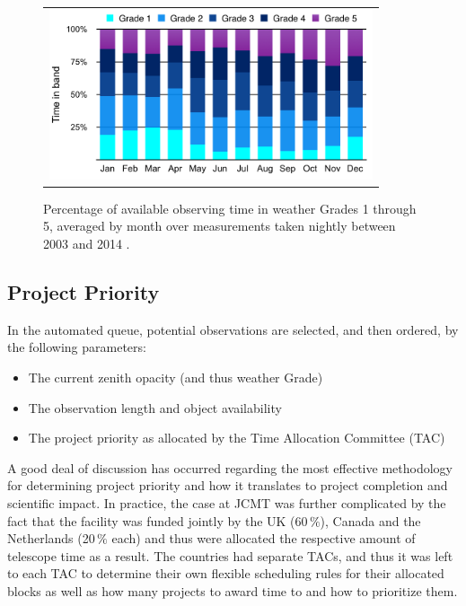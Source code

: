 \documentclass[]{spie}  %
\begin{document}
  \begin{figure}[h]
   \begin{center}
   \begin{tabular}{c}
   \includegraphics[height=5cm]{tauaverageperc}
   \end{tabular}
   \end{center}
   \caption{\label{fig:tau} Percentage of available observing time in weather Grades 1 through 5, averaged by month over measurements taken nightly between 2003 and 2014 .}
\end{figure}

\subsection{Project Priority}

In the automated queue, potential observations are selected, and then
ordered, by the following parameters:
\begin{itemize}
\item The current zenith opacity (and thus weather Grade)
\item The observation length and object availability
\item The project priority as allocated by the Time Allocation Committee (TAC)
\end{itemize}

A good deal of discussion has occurred regarding the most effective
methodology for determining project priority and how it translates to
project completion and scientific impact\cite{adamson2004,robson2002}.
In practice, the case at JCMT was further complicated by the fact that
the facility was funded jointly by the UK (60\,$\%$), Canada and the
Netherlands (20\,$\%$ each) and thus were allocated the respective
amount of telescope time as a result. The countries had separate TACs,
and thus it was left to each TAC to determine their own flexible
scheduling rules for their allocated blocks as well as how many
projects to award time to and how to prioritize them.
\end{document}
